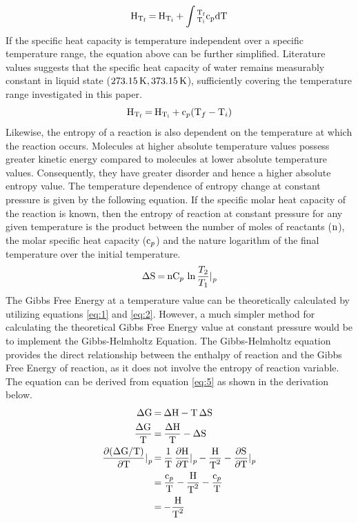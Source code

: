 \documentclass{article}
\begin{document}
\begin{equation}
\ce{H_{T_f} = H_{T_i} + \int{_{T_{i}}^{T_{f}} c_p dT}} \label{eq:8}
\end{equation}
If the specific heat capacity is temperature independent over a specific temperature range, the equation above can be further simplified. Literature values suggests that the specific heat capacity of water remains measurably constant in liquid state ($\ce{273.15K, 373.15K}$), sufficiently covering the temperature range investigated in this paper.
\begin{equation}
\ce{H_{T_f} = H_{T_i} + c_p(T_f - T_i)} \label{eq:1}
\end{equation}
Likewise, the entropy of a reaction is also dependent on the temperature at which the reaction occurs. Molecules at higher absolute temperature values possess greater kinetic energy compared to molecules at lower absolute temperature values. Consequently, they have greater disorder and hence a higher absolute entropy value. The temperature dependence of entropy change at constant pressure is given by the following equation. If the specific molar heat capacity of the reaction is known, then the entropy of reaction at constant pressure for any given temperature is the product between the number of moles of reactants ($\ce{n}$), the molar specific heat capacity ($\ce{c_p}$) and the nature logarithm of the final temperature over the initial temperature.
\begin{equation}
\ce{\Delta S = nC_p \ln{\frac{T_2}{T_1}}|_p} \label{eq:2}
\end{equation}
The Gibbs Free Energy at a temperature value can be theoretically calculated by utilizing equations \ref{eq:1} and \ref{eq:2}. However, a much simpler method for calculating the theoretical Gibbs Free Energy value at constant pressure would be to implement the Gibbs-Helmholtz Equation. The Gibbs-Helmholtz equation provides the direct relationship between the enthalpy of reaction and the Gibbs Free Energy of reaction, as it does not involve the entropy of reaction variable. The equation can be derived from equation \ref{eq:5} as shown in the derivation below.
\begin{equation}
\begin{split}
\ce{
\Delta G &= \Delta H - T \Delta S \\ 
\frac{\Delta G}{T} &= \frac{\Delta H}{T} - \Delta S \\ 
\frac{\partial (\Delta G/T)}{\partial T}|_p &= \frac{1}{T} \frac{\partial H}{\partial T}|_p - \frac{H}{T^2} - \frac{\partial S}{\partial T}|_p \\ 
&= \frac{c_p}{T} - \frac{H}{T^2} - \frac{c_p}{T} \\ 
&= -\frac{H}{T^2}
}
\end{split}
\end{equation}
\end{document}

